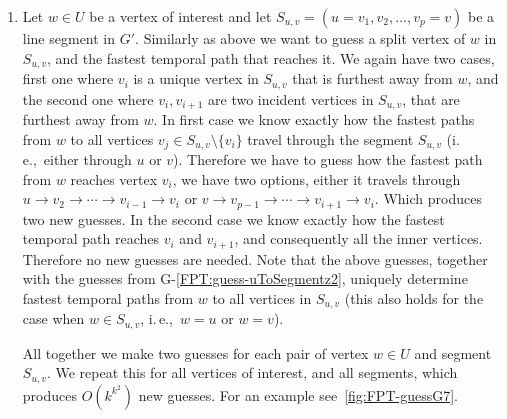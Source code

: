\documentclass[11pt,a4paper]{article}
\theoremstyle{remark}
\theoremstyle{definition}
\newcommand{\ie}{i.\,e.,\ }
\newcounter{guesscounter}
\begin{document}
\begin{enumerate}[G-1.]
\begin{enumerate}
    the fastest paths of form
    $u \leadsto w \rightarrow z_2$
    and $u \leadsto z \rightarrow z_{p-1}$
    (see guess~G-\ref{FPT:guess-uToSegmentz2}).
    \end{enumerate}
    Note that this case results also in knowing the fastest paths from the vertex $v_i \in S_{u,v}$ to $w,z \in S_{w,z}$ for all segments $S_{w,z}$, 
    \ie we know the fastest paths from a fixed $v_i \in S_{u,v}$ to all vertices of interest in $U$.
    For an example see~\cref{fig:FPT-guessG6}.
    \item \label{FPT:guess-splitFromUtoAnotherSegment}
    Let $w \in U$ be a vertex of interest and let $S_{u,v} = (u=v_1,v_2, \dots, v_p = v)$ be a line segment in $G'$.
    Similarly as above we want to guess a split vertex of $w$ in $S_{u,v}$, and the fastest temporal path that reaches it.
    We again have two cases,
    first one where $v_i$ is a unique vertex in $S_{u,v}$ that is furthest away from $w$,
    and the
    second one where $v_i, v_{i+1}$ are two incident vertices in $S_{u,v}$, that are furthest away from $w$.
    In first case we know exactly how the fastest paths from $w$ to all vertices $v_j \in S_{u,v} \setminus \{v_i\}$
    travel through the segment $S_{u,v}$ (\ie either through $u$ or $v$).
    Therefore we have to guess how the fastest path from $w$ reaches vertex $v_i$,
    we have two options, either it travels through $u \rightarrow v_2 \rightarrow \cdots \rightarrow v_{i-1} \rightarrow v_i$
    or 
    $v \rightarrow v_{p-1} \rightarrow \cdots \rightarrow v_{i+1} \rightarrow v_i$.
    Which produces two new guesses.
    In the second case we know exactly how the fastest temporal path reaches $v_i$ and $v_{i+1}$, and consequently all the inner vertices.
    Therefore no new guesses are needed.
    Note that the above guesses, together with the guesses from G-\ref{FPT:guess-uToSegmentz2},
    uniquely determine fastest temporal paths from $w$ to all vertices in $S_{u,v}$ 
    (this also holds for the case when $w \in S_{u,v}$, \ie $w = u$ or $w = v$).
    
    All together we make two guesses for each pair of vertex $w \in U$ and segment $S_{u,v}$.
    We repeat this for all vertices of interest, and all segments,
    which produces $O(k^{k^2})$ new guesses.
    For an example see~\cref{fig:FPT-guessG7}.
    \setcounter{guesscounter}{\value{enumi}}
\end{enumerate}
%
\end{document}
